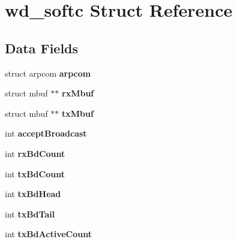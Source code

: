 \hypertarget{structwd__softc}{}\section{wd\+\_\+softc Struct Reference}
\label{structwd__softc}
\subsection*{Data Fields}
\begin{DoxyCompactItemize}
\item 
\mbox{\label{structwd__softc_a5d79525fd1e521ab41b93dc5064e5deb}} 
struct arpcom {\bfseries arpcom}
\item 
\mbox{\label{structwd__softc_ac181bebcbaea25b6e4ce2489264b258c}} 
struct mbuf $\ast$$\ast$ {\bfseries rx\+Mbuf}
\item 
\mbox{\label{structwd__softc_acea0733460c0cace99e44908bd482d2c}} 
struct mbuf $\ast$$\ast$ {\bfseries tx\+Mbuf}
\item 
\mbox{\label{structwd__softc_aae6e87754db03b993bc649e7cc31b1be}} 
int {\bfseries accept\+Broadcast}
\item 
\mbox{\label{structwd__softc_aad57b795b33888aea7302484b891999d}} 
int {\bfseries rx\+Bd\+Count}
\item 
\mbox{\label{structwd__softc_a1a516a8430a98afe90cdd842702ad889}} 
int {\bfseries tx\+Bd\+Count}
\item 
\mbox{\label{structwd__softc_ad35b82ea02c1af4392e1ac5311a1c8aa}} 
int {\bfseries tx\+Bd\+Head}
\item 
\mbox{\label{structwd__softc_ad6dac9130dc8ac47250160b08ca50287}} 
int {\bfseries tx\+Bd\+Tail}
\item 
\mbox{\label{structwd__softc_a0547a46c9e2a8f12fb4540850864879b}} 
int {\bfseries tx\+Bd\+Active\+Count}
\item 
\mbox{\label{structwd__softc_a8e2800b71a776a831cf342bb81018a26}} 

\end{DoxyCompactItemize}
